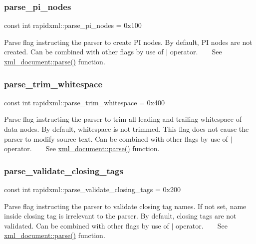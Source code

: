 \subsubsection{\texorpdfstring{parse\_pi\_nodes}{parse\_pi\_nodes}}
{\footnotesize\ttfamily const int rapidxml\+::parse\+\_\+pi\+\_\+nodes = 0x100}

Parse flag instructing the parser to create PI nodes. By default, PI nodes are not created. Can be combined with other flags by use of $\vert$ operator. ~\newline
~\newline
 See \mbox{\hyperlink{classrapidxml_1_1xml__document_ac6e73ff9ac323bf5a370c38feb03a6b1}{xml\+\_\+document\+::parse()}} function. \mbox{\label{namespacerapidxml_a61912424b47db5038e726d4e1c22417f}} 
\subsubsection{\texorpdfstring{parse\_trim\_whitespace}{parse\_trim\_whitespace}}
{\footnotesize\ttfamily const int rapidxml\+::parse\+\_\+trim\+\_\+whitespace = 0x400}

Parse flag instructing the parser to trim all leading and trailing whitespace of data nodes. By default, whitespace is not trimmed. This flag does not cause the parser to modify source text. Can be combined with other flags by use of $\vert$ operator. ~\newline
~\newline
 See \mbox{\hyperlink{classrapidxml_1_1xml__document_ac6e73ff9ac323bf5a370c38feb03a6b1}{xml\+\_\+document\+::parse()}} function. \mbox{\label{namespacerapidxml_a7ce8f40fda68338e20b56f41e48e49f3}} 
\subsubsection{\texorpdfstring{parse\_validate\_closing\_tags}{parse\_validate\_closing\_tags}}
{\footnotesize\ttfamily const int rapidxml\+::parse\+\_\+validate\+\_\+closing\+\_\+tags = 0x200}

Parse flag instructing the parser to validate closing tag names. If not set, name inside closing tag is irrelevant to the parser. By default, closing tags are not validated. Can be combined with other flags by use of $\vert$ operator. ~\newline
~\newline
 See \mbox{\hyperlink{classrapidxml_1_1xml__document_ac6e73ff9ac323bf5a370c38feb03a6b1}{xml\+\_\+document\+::parse()}} function. \mbox{\label{namespacerapidxml_a65477b812a80f5bda693ec57e57de064}} 
